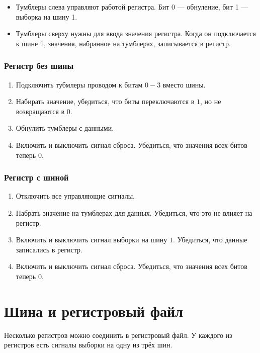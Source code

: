 \documentclass{book}
\begin{document}
\begin{itemize}
  \item Тумблеры слева управляют работой регистра. Бит 0 --- обнуление, бит 1 --- выборка на шину 1.
  \item Тумблеры сверху нужны для ввода значения регистра. Когда он подключается к шине 1,
        значения, набранное на тумблерах, записывается в регистр.
\end{itemize}

\subsubsection{Регистр без шины}

\begin{enumerate}
    \item Подключить тубмлеры проводом к битам $0-3$ вместо шины.
    \item Набирать значение, убедиться, что биты переключаются в $1$, но не возвращаются в $0$.
    \item Обнулить тумблеры с данными.
    \item Включить и выключить сигнал сброса. Убедиться, что значения всех битов теперь $0$.
\end{enumerate}

\subsubsection{Регистр с шиной}

\begin{enumerate}
    \item Отключить все управляющие сигналы.
    \item Набрать значение на тумблерах для данных. Убедиться, что это не влияет на регистр.
    \item Включить и выключить сигнал выборки на шину $1$. Убедиться, что данные записались в регистр.
    \item Включить и выключить сигнал сброса. Убедиться, что значения всех битов теперь $0$.
\end{enumerate}

\section{Шина и регистровый файл}

Несколько регистров можно соединить в регистровый файл.
У каждого из регистров есть сигналы выборки на одну из трёх шин.
\end{document}
